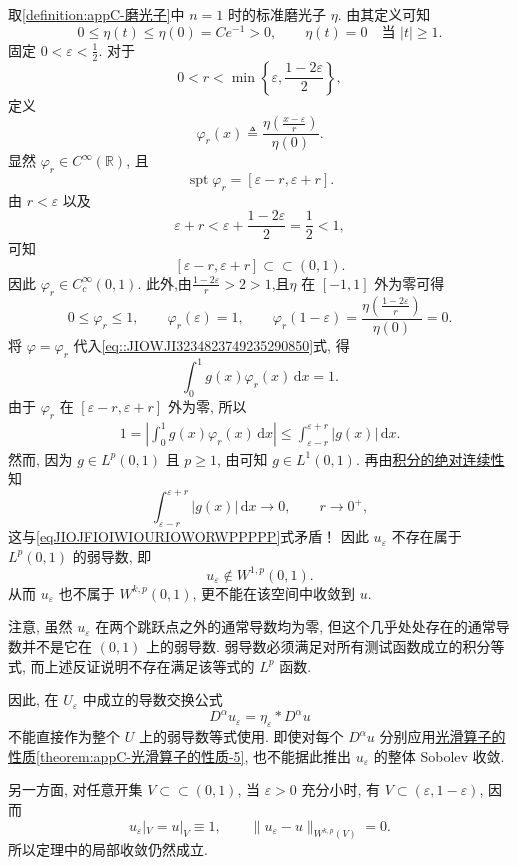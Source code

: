 \documentclass[../../main.tex]{subfiles}
\begin{document}
\begin{remark}
取\cref{definition:appC-磨光子}中 $n=1$ 时的标准磨光子 $\eta$.
由其定义可知
\[
0\leqslant\eta(t)\leqslant\eta(0)=Ce^{-1}>0,
\qquad
\eta(t)=0\quad\text{当 }|t|\geqslant1.
\]
固定 $0<\varepsilon<\frac12$.
对于
\[
0<r<\min\left\{\varepsilon,\frac{1-2\varepsilon}{2}\right\},
\]
定义
\[
\varphi _r(x)\triangleq \frac{\eta \left( \frac{x-\varepsilon}{r} \right)}{\eta (0)}.
\]
显然 $\varphi_r\in C^\infty(\mathbb R)$,
且
\[
\operatorname{spt}\varphi_r
=[\varepsilon-r,\varepsilon+r].
\]
由 $r<\varepsilon$ 以及
\[
\varepsilon+r
<\varepsilon+\frac{1-2\varepsilon}{2}
=\frac12<1,
\]
可知
\[
[\varepsilon-r,\varepsilon+r]\subset\subset(0,1).
\]
因此
$\varphi_r\in C_c^\infty(0,1)$.
此外,由$\frac{1-2\varepsilon}{r}>2>1$,且$\eta$ 在 $[-1,1]$ 外为零可得
\[
0\leqslant\varphi_r\leqslant1,\qquad
\varphi_r(\varepsilon)=1,\qquad \varphi _r(1-\varepsilon )=\frac{\eta \left( \frac{1-2\varepsilon}{r} \right)}{\eta (0)}
=0.
\]
将 $\varphi=\varphi_r$ 代入\eqref{eq::JIOWJI3234823749235290850}式, 得
\[
\int_0^1g(x)\varphi_r(x)\,\mathrm{d}x=1.
\]
由于 $\varphi_r$ 在
$[\varepsilon-r,\varepsilon+r]$ 外为零, 所以
\begin{align}
1
=\left|\int_0^1g(x)\varphi_r(x)\,\mathrm{d}x\right|
\leqslant
\int_{\varepsilon-r}^{\varepsilon+r}|g(x)|\,\mathrm{d}x.\label{eqJIOJFIOIWIOURIOWORWPPPPP}
\end{align}
然而, 因为 $g\in L^p(0,1)$ 且 $p\geqslant1$,
由可知 $g\in L^1(0,1)$.
再由\hyperref[Real Analysis-theorem:积分的绝对连续性]{积分的绝对连续性}知
\[
\int_{\varepsilon-r}^{\varepsilon+r}|g(x)|\,\mathrm{d}x
\to0,\qquad r\to0^+,
\]
这与\eqref{eqJIOJFIOIWIOURIOWORWPPPPP}式矛盾！
因此 $u_\varepsilon$ 不存在属于 $L^p(0,1)$ 的弱导数,
即
\[
u_\varepsilon\notin W^{1,p}(0,1).
\]
从而 $u_\varepsilon$ 也不属于 $W^{k,p}(0,1)$,
更不能在该空间中收敛到 $u$.

注意, 虽然 $u_\varepsilon$ 在两个跳跃点之外的通常导数均为零,
但这个几乎处处存在的通常导数并不是它在 $(0,1)$ 上的弱导数.
弱导数必须满足对所有测试函数成立的积分等式,
而上述反证说明不存在满足该等式的 $L^p$ 函数.

因此, 在 $U_\varepsilon$ 中成立的导数交换公式
\[
D^\alpha u_\varepsilon
=\eta_\varepsilon*D^\alpha u
\]
不能直接作为整个 $U$ 上的弱导数等式使用.
即使对每个 $D^\alpha u$ 分别应用\hyperref[theorem:appC-光滑算子的性质]{光滑算子的性质\ref{theorem:appC-光滑算子的性质-5}}, 也不能据此推出
$u_\varepsilon$ 的整体 Sobolev 收敛.

另一方面, 对任意开集 $V\subset\subset(0,1)$,
当 $\varepsilon>0$ 充分小时,
有 $V\subset(\varepsilon,1-\varepsilon)$,
因而
\[
u_\varepsilon|_V=u|_V\equiv1,
\qquad
\|u_\varepsilon-u\|_{W^{k,p}(V)}=0.
\]
所以定理中的局部收敛仍然成立.
\end{remark}
\end{document}
